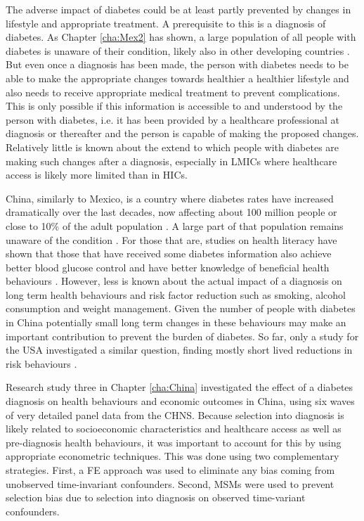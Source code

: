 The adverse impact of diabetes could be at least partly prevented by changes in lifestyle and appropriate treatment. A prerequisite to this is a diagnosis of diabetes. As Chapter \ref{cha:Mex2} has shown, a large population of all people with diabetes is unaware of their condition, likely also in other developing countries \parencite{Beagley2014}. But even once a diagnosis has been made, the person with diabetes needs to be able to make the appropriate changes towards healthier a healthier lifestyle and also needs to receive appropriate medical treatment to prevent complications. This is only possible if this information is accessible to and understood by the person with diabetes, i.e. it has been provided by a healthcare professional at diagnosis or thereafter and the person is capable of making the proposed changes. Relatively little is known about the extend to which people with diabetes are making such changes after a diagnosis, especially in \acp{LMIC} where healthcare access is likely more limited than in \acp{HIC}.

China, similarly to Mexico, is a country where diabetes rates have increased dramatically over the last decades, now affecting about 100 million people or close to 10\% of the adult population \parencite{Risk2016}. A large part of that population remains unaware of the condition \parencite{Wang2015}. For those that are, studies on health literacy have shown that those that have received some diabetes information also achieve better blood glucose control and have better knowledge of beneficial health behaviours \parencite{Guo2012}. However, less is known about the actual impact of a diagnosis on long term health behaviours and risk factor reduction such as smoking, alcohol consumption and weight management. Given the number of people with diabetes in China potentially small long term changes in these behaviours may make an important contribution to prevent the burden of diabetes. So far, only a study for the USA investigated a similar question, finding mostly short lived reductions in risk behaviours \parencite{Slade2012}. 

Research study three in Chapter \ref{cha:China} investigated the effect of a diabetes diagnosis on health behaviours and economic outcomes in China, using six waves of very detailed panel data from the \ac{CHNS}. Because selection into diagnosis is likely related to socioeconomic characteristics and healthcare access as well as pre-diagnosis health behaviours, it was important to account for this by using appropriate econometric techniques. This was done using two complementary strategies. First, a \ac{FE} approach was used to eliminate any bias coming from unobserved time-invariant confounders. Second, \acp{MSM} were used to prevent selection bias due to selection into diagnosis on observed time-variant confounders.


